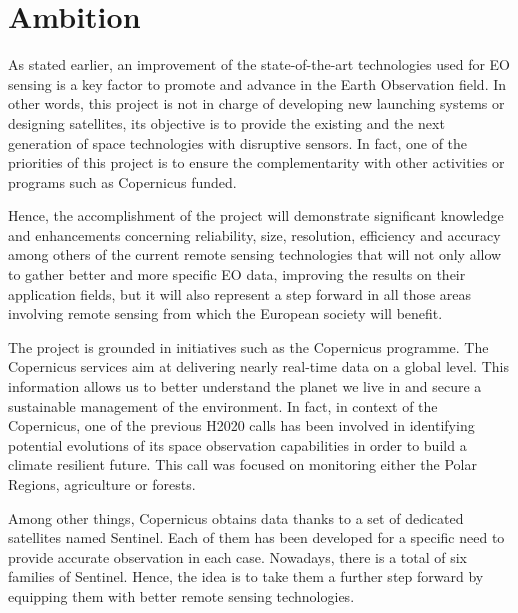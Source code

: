 \section{Ambition}



As stated earlier, an improvement of the state-of-the-art technologies used for EO sensing is a key factor to promote and advance in the Earth Observation field. In other words, this project is not in charge of developing new launching systems or designing satellites, its objective is to provide the existing and the next generation of space technologies with disruptive sensors. In fact, one of the priorities of this project is to ensure the complementarity with other activities or programs such as Copernicus funded.

Hence, the accomplishment of the project will demonstrate significant knowledge and enhancements concerning reliability, size, resolution, efficiency and accuracy among others of the current remote sensing technologies that will not only allow to gather better and more specific EO data, improving the results on their application fields, but it will also represent a step forward in all those areas involving remote sensing from which the European society will benefit. 

The project is grounded in initiatives such as the Copernicus programme\cite{copernicus}. The Copernicus services aim at delivering nearly real-time data on a global level. This information allows us to better understand the planet we live in and secure a sustainable management of the environment. In fact, in context of the Copernicus, one of the previous H2020 calls has been involved in identifying potential evolutions of its space observation capabilities in order to build a climate resilient future. This call was focused on monitoring either the Polar Regions, agriculture or forests.

Among other things, Copernicus obtains data thanks to a set of dedicated satellites named Sentinel. Each of them has been developed for a specific need to provide accurate observation in each case. Nowadays, there is a total of six families of Sentinel. Hence, the idea is to take them a further step forward by equipping them with better remote sensing technologies. 